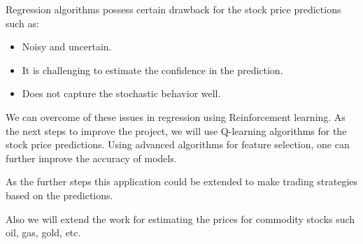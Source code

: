 \documentclass[12pt]{article}
\begin{document}
Regression algorithms possess certain drawback for the stock price predictions such as:

\begin{itemize}
\item Noisy and uncertain. 
\item It is challenging to estimate the confidence in the prediction.
\item Does not capture the stochastic behavior well.
\end{itemize}

We can overcome of these issues in regression using Reinforcement learning. As the next steps to improve the project, we will use Q-learning algorithms for the stock price predictions. Using advanced algorithms for feature selection, one can further improve the accuracy of models. 

As the further steps this application could be extended to make trading strategies based on the predictions.

Also we will extend the work for estimating the prices for commodity stocks such oil, gas, gold, etc.

\end{document}
